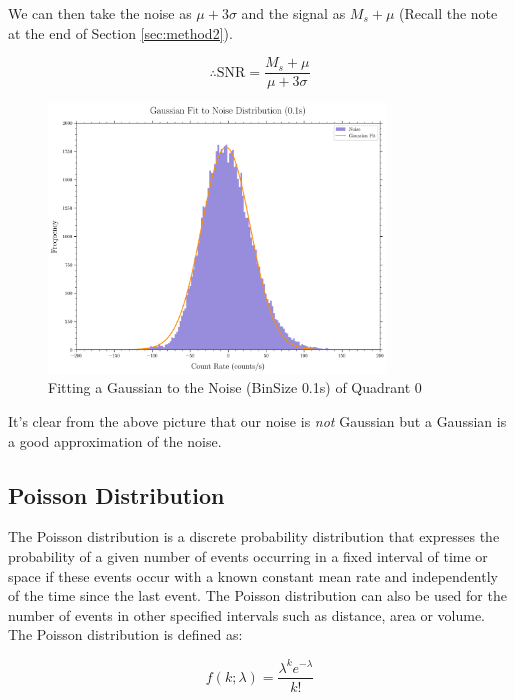 \documentclass[11pt]{book} %
\begin{document}
We can then take the noise as $\mu+3\sigma$ and the signal as $M_s+\mu$ (Recall the note at the end of Section \ref{sec:method2}).

\begin{equation}
    \therefore \text{SNR} = \frac{M_s+\mu}{\mu+3\sigma}
\end{equation}

\begin{figure}[H]
    \centering
    \includegraphics[width=0.8\textwidth]{Pictures/gaussian_fit.png}
    \caption{Fitting a Gaussian to the Noise (BinSize 0.1s) of Quadrant 0}
\end{figure}

It's clear from the above picture that our noise is \textit{not} Gaussian but a Gaussian is a good approximation of the noise.


\subsection{Poisson Distribution}

The Poisson distribution is a discrete probability distribution that expresses the probability of a given number of events occurring in a fixed interval of time or space if these events occur with a known constant mean rate and independently of the time since the last event. The Poisson distribution can also be used for the number of events in other specified intervals such as distance, area or volume. The Poisson distribution is defined as:

\begin{equation} \label{eq:Poisson}
    f(k; \lambda)=\frac{\lambda^k e^{-\lambda}}{k!}
\end{equation}
    
\end{document}
